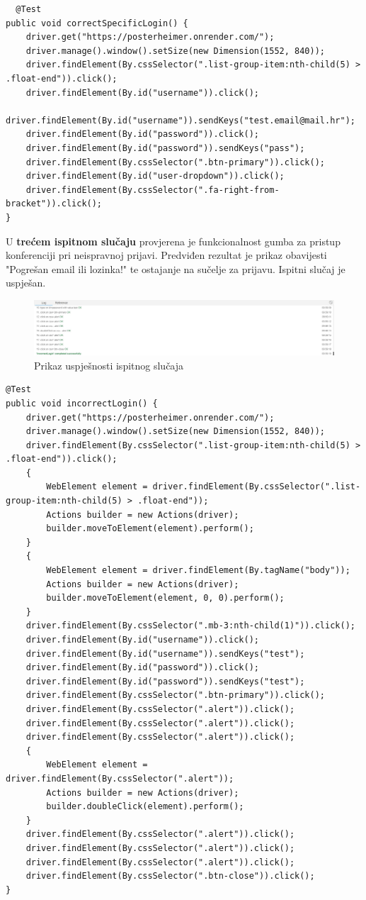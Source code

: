 			\begin{lstlisting}
  @Test
public void correctSpecificLogin() {
	driver.get("https://posterheimer.onrender.com/");
	driver.manage().window().setSize(new Dimension(1552, 840));
	driver.findElement(By.cssSelector(".list-group-item:nth-child(5) > .float-end")).click();
	driver.findElement(By.id("username")).click();
	driver.findElement(By.id("username")).sendKeys("test.email@mail.hr");
	driver.findElement(By.id("password")).click();
	driver.findElement(By.id("password")).sendKeys("pass");
	driver.findElement(By.cssSelector(".btn-primary")).click();
	driver.findElement(By.id("user-dropdown")).click();
	driver.findElement(By.cssSelector(".fa-right-from-bracket")).click();
}
			\end{lstlisting}
			
			
			U \textbf{trećem ispitnom slučaju} provjerena je funkcionalnost gumba za pristup konferenciji pri neispravnoj prijavi. Predviđen rezultat je prikaz obavijesti "Pogrešan email ili lozinka!" te ostajanje na sučelje za prijavu. Ispitni slučaj je uspješan.
			\begin{figure} [hbt!]
				\includegraphics[width=\linewidth]{Slike/IncorrectLogin}
				\caption{Prikaz uspješnosti ispitnog slučaja}
			\end{figure}
			
			\begin{lstlisting}
@Test
public void incorrectLogin() {
	driver.get("https://posterheimer.onrender.com/");
	driver.manage().window().setSize(new Dimension(1552, 840));
	driver.findElement(By.cssSelector(".list-group-item:nth-child(5) > .float-end")).click();
	{
		WebElement element = driver.findElement(By.cssSelector(".list-group-item:nth-child(5) > .float-end"));
		Actions builder = new Actions(driver);
		builder.moveToElement(element).perform();
	}
	{
		WebElement element = driver.findElement(By.tagName("body"));
		Actions builder = new Actions(driver);
		builder.moveToElement(element, 0, 0).perform();
	}
	driver.findElement(By.cssSelector(".mb-3:nth-child(1)")).click();
	driver.findElement(By.id("username")).click();
	driver.findElement(By.id("username")).sendKeys("test");
	driver.findElement(By.id("password")).click();
	driver.findElement(By.id("password")).sendKeys("test");
	driver.findElement(By.cssSelector(".btn-primary")).click();
	driver.findElement(By.cssSelector(".alert")).click();
	driver.findElement(By.cssSelector(".alert")).click();
	driver.findElement(By.cssSelector(".alert")).click();
	{
		WebElement element = driver.findElement(By.cssSelector(".alert"));
		Actions builder = new Actions(driver);
		builder.doubleClick(element).perform();
	}
	driver.findElement(By.cssSelector(".alert")).click();
	driver.findElement(By.cssSelector(".alert")).click();
	driver.findElement(By.cssSelector(".alert")).click();
	driver.findElement(By.cssSelector(".btn-close")).click();
}
			\end{lstlisting}
			
